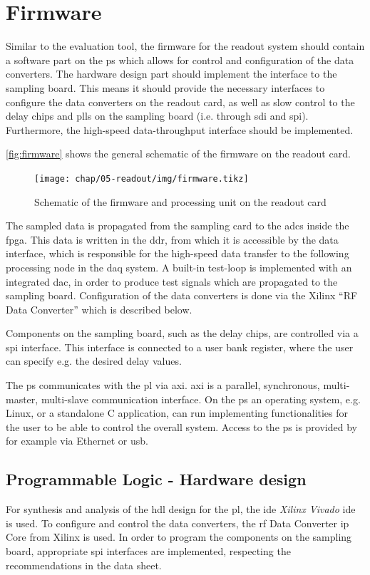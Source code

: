 \section{Firmware}\label{sec:firmware}
Similar to the evaluation tool, the firmware for the readout system should contain a software part on the \gls{ps} which allows for control and configuration of the data converters. 
The hardware design part should implement the interface to the sampling board. 
This means it should provide the necessary interfaces to configure the data converters on the readout card, as well as slow control to the delay chips and \glspl{pll} on the sampling board (i.e. through \gls{sdi} and \gls{spi}). 
Furthermore, the high-speed data-throughput interface should be implemented.

\autoref{fig:firmware} shows the general schematic of the firmware on the readout card.
\begin{figure}[tb]
	\centering
	\texttt{[image: chap/05-readout/img/firmware.tikz]}
	\caption{Schematic of the firmware and processing unit on the readout card}
	\label{fig:firmware}
\end{figure}

The sampled data is propagated from the sampling card to the \glspl{adc} inside the \gls{fpga}. 
This data is written in the \gls{ddr}, from which it is accessible by the data interface, which is responsible for the high-speed data transfer to the following processing node in the \gls{daq} system.
A built-in test-loop is implemented with an integrated \gls{dac}, in order to produce test signals which are propagated to the sampling board.
Configuration of the data converters is done via the Xilinx ``RF Data Converter'' which is described below. 

Components on the sampling board, such as the delay chips, are controlled via a \gls{spi} interface. 
This interface is connected to a user bank register, where the user can specify e.g. the desired delay values.

The \gls{ps} communicates with the \gls{pl} via \gls{axi}.
\gls{axi} is a parallel, synchronous, multi-master, multi-slave communication interface.
On the \gls{ps} an operating system, e.g. Linux, or a standalone C application, can run implementing functionalities for the user to be able to control the overall system.
Access to the \gls{ps} is provided by for example via Ethernet or \gls{usb}.


\subsection{Programmable Logic - Hardware design}
For synthesis and analysis of the \gls{hdl} design for the \gls{pl}, the \gls{ide} \textit{Xilinx Vivado} \gls{ide} is used.
To configure and control the data converters, the \gls{rf} Data Converter \gls{ip} Core from Xilinx is used.
In order to program the components on the sampling board, appropriate \gls{spi} interfaces are implemented, respecting the recommendations in the data sheet.

